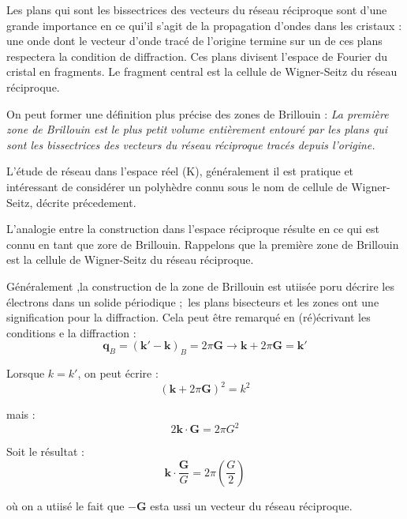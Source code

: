 Les plans qui sont les bissectrices des vecteurs du réseau réciproque sont d'une
grande importance en ce qui'il s'agit de la propagation d'ondes dans les
cristaux : une onde dont le vecteur d'onde tracé de l'origine termine sur un 
de ces plans respectera la condition de diffraction. Ces plans divisent l'espace
de Fourier du cristal en fragments. Le fragment central est la cellule de
Wigner-Seitz du réseau réciproque.

On peut former une définition plus précise des zones de Brillouin : \emph{
    La première zone de Brillouin est le plus petit volume entièrement entouré
    par les plans qui sont les bissectrices des vecteurs du réseau réciproque
tracés depuis l'origine.}




L'étude de réseau dans l'espace réel (K), généralement il est pratique et
intéressant de considérer un polyhèdre connu sous le nom de cellule de 
Wigner-Seitz, décrite précedement.

L'analogie entre la construction dans l'espace réciproque résulte en ce qui est
connu en tant que zore de Brillouin. Rappelons que la première zone de Brillouin 
est la cellule de Wigner-Seitz du réseau réciproque.

Généralement ,la construction de la zone de Brillouin est utiisée poru décrire
les électrons dans un solide périodique ; les plans bisecteurs et les
zones ont une signification pour la diffraction. Cela peut être remarqué en 
(ré)écrivant les conditions e la diffraction :
\begin{equation}
    \mathbf{q}_B = (\mathbf{k'-k})_B = 2\pi\mathbf{G} \rightarrow \mathbf{k} + 2\pi \mathbf{G} = \mathbf{k'}
\end{equation}

Lorsque $k=k'$, on peut écrire :
\begin{equation}
    (\mathbf{k} + 2\pi \mathbf{G})^2 = k^2
\end{equation}

mais :
\begin{equation}
    2 \mathbf{k\cdot G} = 2\pi G^2
\end{equation}

Soit le résultat :
\begin{equation}
    \mathbf{k}\cdot\frac{\mathbf{G}}{G} = 2\pi \left( \frac{G}{2} \right)
\end{equation}

où on a utiisé le fait que $-\mathbf{G}$ esta ussi un vecteur du réseau
réciproque.

